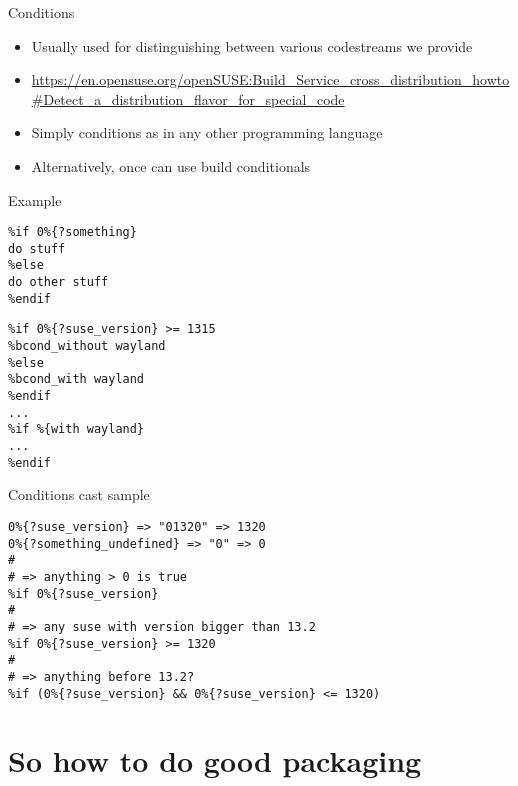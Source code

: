 \documentclass{beamer}
\begin{document}
\begin{frame}[t]{Conditions}
	\begin{itemize}
	\item Usually used for distinguishing between various codestreams we provide
	\item \begin{scriptsize}\url{https://en.opensuse.org/openSUSE:Build\_Service\_cross\_distribution\_howto\#Detect\_a\_distribution\_flavor\_for\_special_code}\end{scriptsize}
	\item Simply conditions as in any other programming language
	\item Alternatively, once can use build conditionals
	\end{itemize}
\end{frame}

\begin{frame}[fragile]{Example}
	\begin{small}
\begin{verbatim}
%if 0%{?something}
do stuff
%else
do other stuff
%endif
\end{verbatim}
	\end{small}
	\begin{small}
\begin{verbatim}
%if 0%{?suse_version} >= 1315
%bcond_without wayland
%else
%bcond_with wayland
%endif
...
%if %{with wayland}
...
%endif
\end{verbatim}
	\end{small}
\end{frame}

\begin{frame}[fragile]{Conditions cast sample}
       \begin{small}
\begin{verbatim}
0%{?suse_version} => "01320" => 1320
0%{?something_undefined} => "0" => 0
#
# => anything > 0 is true
%if 0%{?suse_version}
#
# => any suse with version bigger than 13.2
%if 0%{?suse_version} >= 1320
#
# => anything before 13.2?
%if (0%{?suse_version} && 0%{?suse_version} <= 1320)
\end{verbatim}
       \end{small}
\end{frame}

\section{So how to do good packaging}
\end{document}
